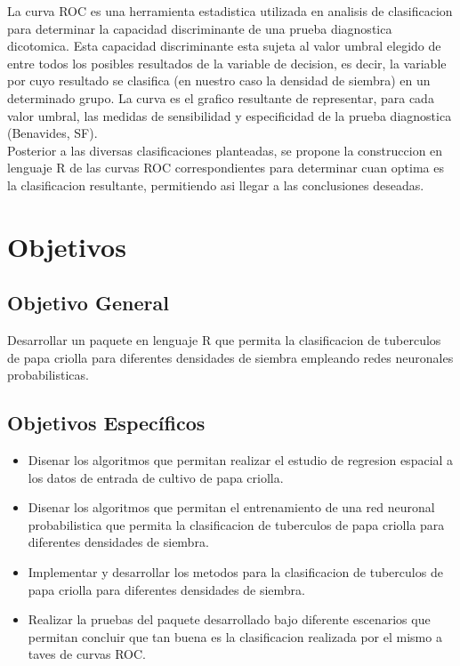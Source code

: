 La curva ROC es una herramienta estadistica utilizada en analisis de clasificacion para determinar la capacidad discriminante de una prueba diagnostica dicotomica. Esta capacidad discriminante esta sujeta al valor umbral elegido de entre todos los posibles resultados de la variable de decision, es decir, la variable por cuyo resultado se clasifica (en nuestro caso la densidad de siembra) en un determinado grupo. La curva es el grafico resultante de representar, para cada valor umbral, las medidas de sensibilidad y especificidad de la prueba diagnostica (Benavides, SF).\\

Posterior a las diversas clasificaciones planteadas, se propone la construccion en lenguaje R de las curvas ROC correspondientes para determinar cuan optima es la clasificacion resultante, permitiendo asi llegar a las conclusiones deseadas. 

\section{Objetivos}

\subsection{Objetivo General}

Desarrollar un paquete en lenguaje R que permita la clasificacion de tuberculos de papa criolla para diferentes densidades de siembra empleando redes neuronales probabilisticas.

\subsection{Objetivos Espec\'ificos}
 
\begin{itemize}
\item{Disenar los algoritmos que permitan realizar el estudio de regresion espacial a los datos de entrada de cultivo de papa criolla.}
\item{Disenar los algoritmos que permitan el entrenamiento de una red neuronal probabilistica que permita la clasificacion de tuberculos de papa criolla para diferentes densidades de siembra.}
\item{Implementar y desarrollar los metodos para la clasificacion de tuberculos de papa criolla para diferentes densidades de siembra.}
\item{Realizar la pruebas del paquete desarrollado bajo diferente escenarios que permitan concluir que tan buena es la clasificacion realizada por el mismo a taves de curvas ROC.}
\end{itemize}

